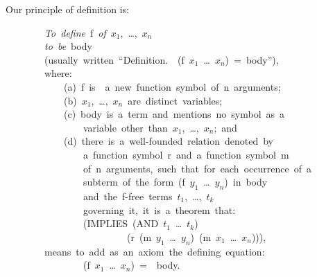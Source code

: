 \documentclass[10pt]{book}
\newenvironment{pubasis}{\begin{flushleft}}{\end{flushleft}}
\begin{document}
Our principle of definition is:
\begin{pubasis}
~~~~~~~~\emph{To~define}~f~\emph{of}~$x_{1}$,~\ldots{},~$x_{n}$\\
~~~~~~~~\emph{to~be}~body\\
~~~~~~~~(usually~written~``Definition.~~(f~$x_{1}$~\ldots{}~$x_{n}$)~=~body''),\\
~~~~~~~~where:\\

~~~~~~~~~~~~(a)~f~is~~a~new~function~symbol~of~n~arguments;\\

~~~~~~~~~~~~(b)~$x_{1}$,~\ldots{},~$x_{n}$~are~distinct~variables;\\

~~~~~~~~~~~~(c)~body~is~a~term~and~mentions~no~symbol~as~a\\
~~~~~~~~~~~~~~~~variable~other~than~$x_{1}$,~\ldots{},~$x_{n}$;~and\\

~~~~~~~~~~~~(d)~there~is~a~well-founded~relation~denoted~by\\
~~~~~~~~~~~~~~~~a~function~symbol~r~and~a~function~symbol~m\\
~~~~~~~~~~~~~~~~of~n~arguments,~such~that~for~each~occurrence~of~a\\
~~~~~~~~~~~~~~~~subterm~of~the~form~(f~$y_{1}$~\ldots{}~$y_{n}$)~in~body\\
~~~~~~~~~~~~~~~~and~the~f-free~terms~$t_{1}$,~\ldots{},~$t_{k}$\\
~~~~~~~~~~~~~~~~governing~it,~it~is~a~theorem~that:\\

~~~~~~~~~~~~~~~~(IMPLIES~(AND~$t_{1}$~\ldots{}~$t_{k}$)\\
~~~~~~~~~~~~~~~~~~~~~~~~~(r~(m~$y_{1}$~\ldots{}~$y_{n}$)~(m~$x_{1}$~\ldots{}~$x_{n}$))),\\

~~~~~~~~means~to~add~as~an~axiom~the~defining~equation:\\

~~~~~~~~~~~~~~~~(f~$x_{1}$~\ldots{}~$x_{n}$)~=~~body.\\
\end{pubasis}

\hrulefill 
\end{document}
